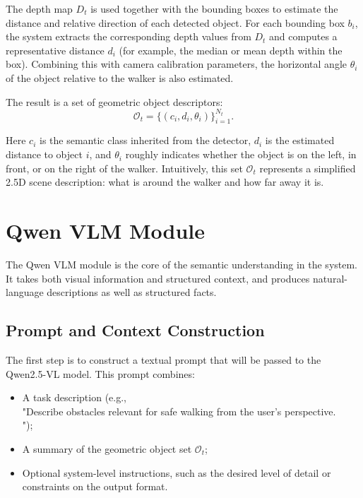 \documentclass{article}
\begin{document}
The depth map $D_t$ is used together with the bounding boxes to estimate the distance and relative direction of each detected object. For each bounding box $b_i$, the system extracts the corresponding depth values from $D_t$ and computes a representative distance $d_i$ (for example, the median or mean depth within the box). Combining this with camera calibration parameters, the horizontal angle $\theta_i$ of the object relative to the walker is also estimated.

The result is a set of geometric object descriptors:
\begin{equation}
    \mathcal{O}_t = \{ (c_i, d_i, \theta_i) \}_{i=1}^{N_t}.
\end{equation}

Here $c_i$ is the semantic class inherited from the detector, $d_i$ is the estimated distance to object $i$, and $\theta_i$ roughly indicates whether the object is on the left, in front, or on the right of the walker. Intuitively, this set $\mathcal{O}_t$ represents a simplified 2.5D scene description: what is around the walker and how far away it is.

\section{Qwen VLM Module}

The Qwen VLM module is the core of the semantic understanding in the system. It takes both visual information and structured context, and produces natural-language descriptions as well as structured facts.

\subsection{Prompt and Context Construction}

The first step is to construct a textual prompt that will be passed to the Qwen2.5-VL model. This prompt combines:
\begin{itemize}
    \item A task description (e.g., \\"Describe obstacles relevant for safe walking from the user's perspective.\\");
    \item A summary of the geometric object set $\mathcal{O}_t$;
    \item Optional system-level instructions, such as the desired level of detail or constraints on the output format.
\end{itemize}
\end{document}
